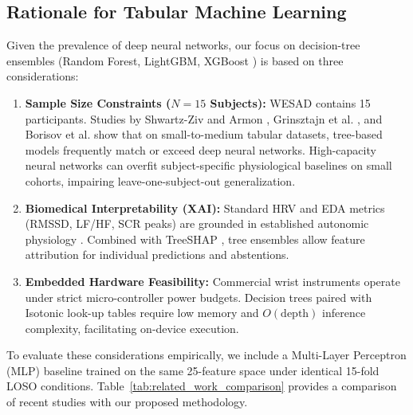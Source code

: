 \documentclass[conference]{IEEEtran}
\begin{document}
\subsection{Rationale for Tabular Machine Learning}
Given the prevalence of deep neural networks, our focus on decision-tree ensembles (Random Forest, LightGBM, XGBoost \cite{chen2016xgboost}) is based on three considerations:
\begin{enumerate}
    \item \textbf{Sample Size Constraints ($N=15$ Subjects):} WESAD contains 15 participants. Studies by Shwartz-Ziv and Armon \cite{shwartzziv2022tabular}, Grinsztajn et al. \cite{grinsztajn2022why}, and Borisov et al. \cite{borisov2024deep} show that on small-to-medium tabular datasets, tree-based models frequently match or exceed deep neural networks. High-capacity neural networks can overfit subject-specific physiological baselines on small cohorts, impairing leave-one-subject-out generalization.
    \item \textbf{Biomedical Interpretability (XAI):} Standard HRV and EDA metrics (RMSSD, LF/HF, SCR peaks) are grounded in established autonomic physiology \cite{taskforce1996heart, greco2016cvxeda, tarvainen2014kubios}. Combined with TreeSHAP \cite{lundberg2020local}, tree ensembles allow feature attribution for individual predictions and abstentions.
    \item \textbf{Embedded Hardware Feasibility:} Commercial wrist instruments operate under strict micro-controller power budgets. Decision trees paired with Isotonic look-up tables require low memory and $O(\text{depth})$ inference complexity, facilitating on-device execution.
\end{enumerate}

To evaluate these considerations empirically, we include a Multi-Layer Perceptron (MLP) baseline trained on the same 25-feature space under identical 15-fold LOSO conditions. Table~\ref{tab:related_work_comparison} provides a comparison of recent studies with our proposed methodology.
\end{document}
